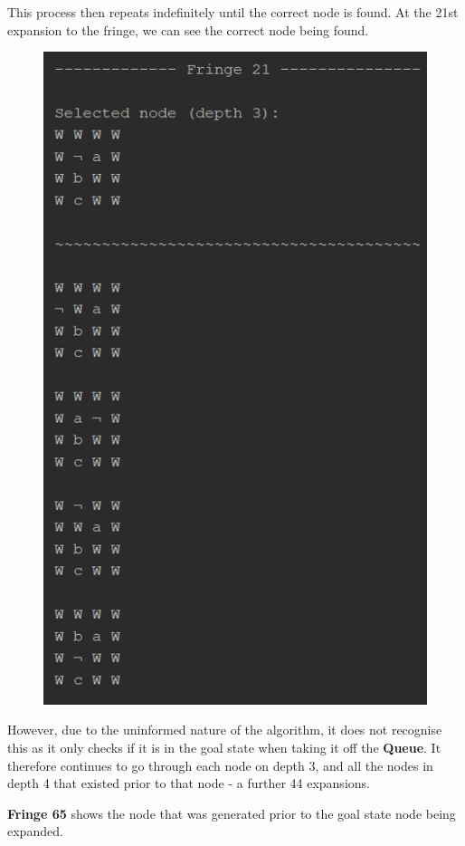 \documentclass{article}
\begin{document}
	This process then repeats indefinitely until the correct node is found. At the 21st expansion to the fringe, we can see the correct node being found.
	\begin{figure}[h]
		\centering
		\includegraphics{BFS-1-4.png}
	\end{figure}

	However, due to the uninformed nature of the algorithm, it does not recognise this as it only checks if it is in the goal state when taking it off the \textbf{Queue}. It therefore continues to go through each node on depth 3, and all the nodes in depth 4 that existed prior to that node - a further 44 expansions. 
	
	\newpage
	\textbf{Fringe 65} shows the node that was generated prior to the goal state node being expanded.
	
\end{document}
